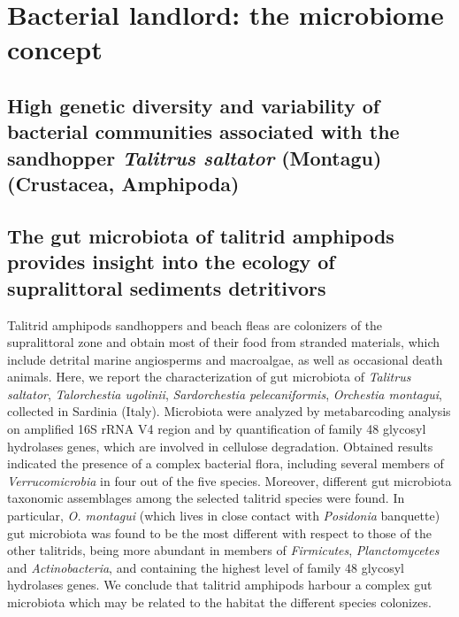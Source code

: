 \logvartrue
\chapter{Bacterial landlord: the microbiome concept}
\section{High genetic diversity and variability of bacterial communities associated with the sandhopper \textit{Talitrus saltator} (Montagu) (Crustacea, Amphipoda)}
\newpage

\newpage


\section{The gut microbiota of talitrid amphipods provides insight into the ecology of supralittoral sediments detritivors}
Talitrid amphipods sandhoppers and beach fleas are colonizers of the supralittoral zone and obtain most of their food from stranded materials, which include detrital marine angiosperms and macroalgae, as well as occasional death animals. Here, we report the characterization of gut microbiota of \textit{Talitrus saltator}, \textit{Talorchestia ugolinii}, \textit{Sardorchestia pelecaniformis}, \textit{Orchestia montagui}, collected in Sardinia (Italy). Microbiota were analyzed by metabarcoding analysis on amplified 16S rRNA V4 region and by quantification of family 48 glycosyl hydrolases genes, which are involved in cellulose degradation. Obtained results indicated the presence of a complex bacterial flora, including several members of \textit{Verrucomicrobia} in four out of the five species. Moreover, different gut microbiota taxonomic assemblages among the selected talitrid species were found. In particular, \textit{O. montagui} (which lives in close contact with \textit{Posidonia} banquette) gut microbiota was found to be the most different with respect to those of the other talitrids, being more abundant in members of \textit{Firmicutes}, \textit{Planctomycetes} and \textit{Actinobacteria}, and containing the highest level of family 48 glycosyl hydrolases genes. We conclude that talitrid amphipods harbour a complex gut microbiota which may be related to the habitat the different species colonizes.\\

